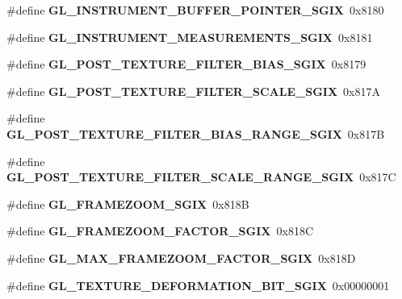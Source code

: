 \begin{DoxyCompactItemize}
\item 
\#define {\bfseries G\+L\+\_\+\+I\+N\+S\+T\+R\+U\+M\+E\+N\+T\+\_\+\+B\+U\+F\+F\+E\+R\+\_\+\+P\+O\+I\+N\+T\+E\+R\+\_\+\+S\+G\+I\+X}~0x8180\label{_s_d_l__opengl_8h_a78948be95eb3e5d4e27413bea2dcf223}

\item 
\#define {\bfseries G\+L\+\_\+\+I\+N\+S\+T\+R\+U\+M\+E\+N\+T\+\_\+\+M\+E\+A\+S\+U\+R\+E\+M\+E\+N\+T\+S\+\_\+\+S\+G\+I\+X}~0x8181\label{_s_d_l__opengl_8h_a2f757e20804286a64aa6e5da4d2f6ec3}

\item 
\#define {\bfseries G\+L\+\_\+\+P\+O\+S\+T\+\_\+\+T\+E\+X\+T\+U\+R\+E\+\_\+\+F\+I\+L\+T\+E\+R\+\_\+\+B\+I\+A\+S\+\_\+\+S\+G\+I\+X}~0x8179\label{_s_d_l__opengl_8h_a9676bdf3ba87e85a5476de1f2910fa6a}

\item 
\#define {\bfseries G\+L\+\_\+\+P\+O\+S\+T\+\_\+\+T\+E\+X\+T\+U\+R\+E\+\_\+\+F\+I\+L\+T\+E\+R\+\_\+\+S\+C\+A\+L\+E\+\_\+\+S\+G\+I\+X}~0x817\+A\label{_s_d_l__opengl_8h_abacc0f90d50e3666e0b494f21df8f540}

\item 
\#define {\bfseries G\+L\+\_\+\+P\+O\+S\+T\+\_\+\+T\+E\+X\+T\+U\+R\+E\+\_\+\+F\+I\+L\+T\+E\+R\+\_\+\+B\+I\+A\+S\+\_\+\+R\+A\+N\+G\+E\+\_\+\+S\+G\+I\+X}~0x817\+B\label{_s_d_l__opengl_8h_a8b9cc74e42f595634e8ac9a810605d25}

\item 
\#define {\bfseries G\+L\+\_\+\+P\+O\+S\+T\+\_\+\+T\+E\+X\+T\+U\+R\+E\+\_\+\+F\+I\+L\+T\+E\+R\+\_\+\+S\+C\+A\+L\+E\+\_\+\+R\+A\+N\+G\+E\+\_\+\+S\+G\+I\+X}~0x817\+C\label{_s_d_l__opengl_8h_aea071ea7e8353e234fe32ed46b9d7846}

\item 
\#define {\bfseries G\+L\+\_\+\+F\+R\+A\+M\+E\+Z\+O\+O\+M\+\_\+\+S\+G\+I\+X}~0x818\+B\label{_s_d_l__opengl_8h_ab8e649db34de6d5eef689ec4fb008ea6}

\item 
\#define {\bfseries G\+L\+\_\+\+F\+R\+A\+M\+E\+Z\+O\+O\+M\+\_\+\+F\+A\+C\+T\+O\+R\+\_\+\+S\+G\+I\+X}~0x818\+C\label{_s_d_l__opengl_8h_a5e1b99cc3cfe0a92c5196e561c9e126f}

\item 
\#define {\bfseries G\+L\+\_\+\+M\+A\+X\+\_\+\+F\+R\+A\+M\+E\+Z\+O\+O\+M\+\_\+\+F\+A\+C\+T\+O\+R\+\_\+\+S\+G\+I\+X}~0x818\+D\label{_s_d_l__opengl_8h_ab38b025240200336dc98231ea68d2a1e}

\item 
\#define {\bfseries G\+L\+\_\+\+T\+E\+X\+T\+U\+R\+E\+\_\+\+D\+E\+F\+O\+R\+M\+A\+T\+I\+O\+N\+\_\+\+B\+I\+T\+\_\+\+S\+G\+I\+X}~0x00000001\label{_s_d_l__opengl_8h_aa737e1c3cb47c0b132ddf16fa602151e}


\end{DoxyCompactItemize}

